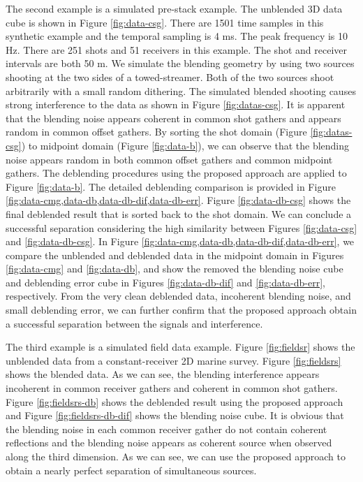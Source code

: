 The second example is a simulated pre-stack example. The unblended 3D data cube is shown in Figure \ref{fig:data-csg}. There are 1501 time samples in this synthetic example and the temporal sampling is 4 ms. The peak frequency is 10 Hz. There are 251 shots and 51 receivers in this example. The shot and receiver intervals are both 50 m. We simulate the blending geometry by using two sources shooting at the two sides of a towed-streamer. Both of the two sources shoot arbitrarily  with a small random dithering. The simulated blended shooting causes strong interference to the data as shown in Figure \ref{fig:datas-csg}. It is apparent that the blending noise appears coherent in common shot gathers and appears random in common offset gathers. By sorting the shot domain (Figure \ref{fig:datas-csg}) to midpoint domain (Figure \ref{fig:data-b}), we can observe that the blending noise appears random in both common offset gathers and common midpoint gathers. The deblending procedures using the proposed approach are applied to Figure \ref{fig:data-b}. The detailed deblending comparison is provided in Figure \ref{fig:data-cmg,data-db,data-db-dif,data-db-err}. Figure \ref{fig:data-db-csg} shows the final deblended result that is sorted back to the shot domain. We can conclude a successful separation considering the high similarity between Figures \ref{fig:data-csg} and \ref{fig:data-db-csg}. In Figure \ref{fig:data-cmg,data-db,data-db-dif,data-db-err}, we compare the unblended and deblended data in the midpoint domain in Figures \ref{fig:data-cmg} and \ref{fig:data-db}, and show the removed the blending noise cube and deblending error cube in Figures \ref{fig:data-db-dif} and \ref{fig:data-db-err}, respectively. From the very clean deblended data, incoherent blending noise, and small deblending error, we can further confirm that the proposed approach obtain a successful separation between the signals and interference.

The third example is a simulated field data example. Figure \ref{fig:fieldsr} shows the unblended data from a constant-receiver 2D marine survey. Figure \ref{fig:fieldsrs} shows the blended data. As we can see, the blending interference appears incoherent in common receiver gathers and coherent in common shot gathers. Figure \ref{fig:fieldsrs-db} shows the deblended result using the proposed approach and Figure \ref{fig:fieldsrs-db-dif} shows the blending noise cube. It is obvious that the blending noise in each common receiver gather do not contain coherent reflections and the blending noise appears as coherent source when observed along the third dimension. As we can see, we can use the proposed approach to obtain a nearly perfect separation of simultaneous sources. 


